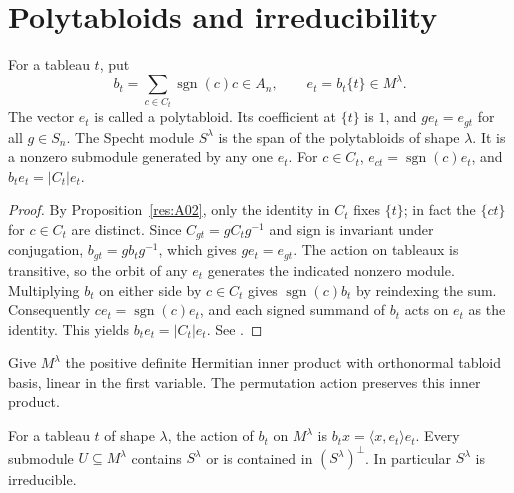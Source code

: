 \section{Polytabloids and irreducibility}

\begin{proposition}
\label{res:A04}
For a tableau \(t\), put
\[
  b_t=\sum_{c\in C_t}\operatorname{sgn}(c)c\in A_n,
  \qquad e_t=b_t\{t\}\in M^\lambda .
\]
The vector \(e_t\) is called a polytabloid. Its coefficient at \(\{t\}\)
is \(1\), and \(g e_t=e_{gt}\) for all \(g\in S_n\).
The Specht module \(S^\lambda\) is the span of the polytabloids of shape
\(\lambda\). It is a nonzero submodule generated by any one \(e_t\).
For \(c\in C_t\), \(e_{ct}=\operatorname{sgn}(c)e_t\), and
\(b_t e_t=|C_t|e_t\).
\end{proposition}

\begin{proof}
By Proposition~\ref{res:A02}, only the identity in \(C_t\) fixes
\(\{t\}\); in fact the \(\{ct\}\) for \(c\in C_t\) are distinct.
Since \(C_{gt}=gC_tg^{-1}\) and sign is invariant under conjugation,
\(b_{gt}=gb_tg^{-1}\), which gives \(ge_t=e_{gt}\). The action on
tableaux is transitive, so the orbit of any \(e_t\) generates the
indicated nonzero module. Multiplying \(b_t\) on either side by
\(c\in C_t\) gives \(\operatorname{sgn}(c)b_t\) by reindexing the sum.
Consequently \(c e_t=\operatorname{sgn}(c)e_t\), and each signed
summand of \(b_t\) acts on \(e_t\) as the identity. This yields
\(b_t e_t=|C_t|e_t\). See \cite[\S2.3]{sagan}.
\end{proof}

Give \(M^\lambda\) the positive definite Hermitian inner product
with orthonormal tabloid basis, linear in the first variable. The
permutation action preserves this inner product.

\begin{theorem}
\label{res:A05}
For a tableau \(t\) of shape \(\lambda\), the action of \(b_t\) on
\(M^\lambda\) is \(b_t x=\langle x,e_t\rangle e_t\).
Every submodule \(U\subseteq M^\lambda\) contains \(S^\lambda\) or
is contained in \((S^\lambda)^\perp\). In particular \(S^\lambda\)
is irreducible.
\end{theorem}


